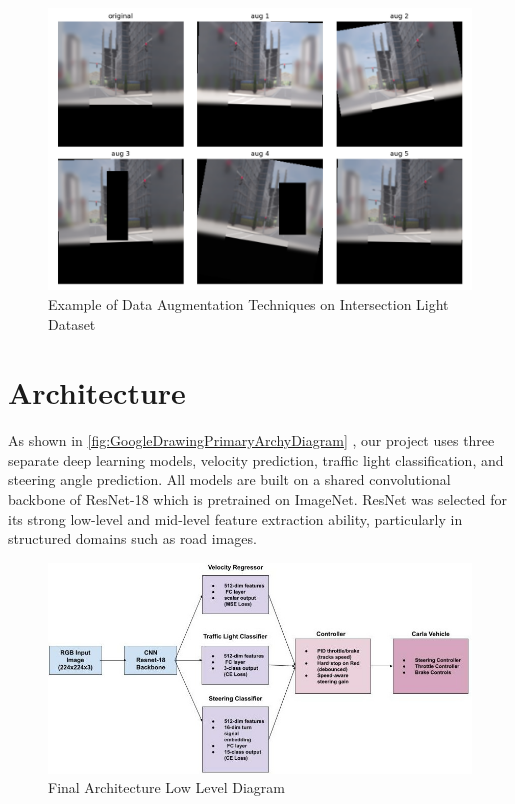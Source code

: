 \documentclass{article} %
\begin{document}
\begin{figure}[H] %
    \centering
    \includegraphics[width=1.0\textwidth]{Data Augmentation.png} %
    \caption{Example of Data Augmentation Techniques on Intersection Light Dataset}
    \label{fig:dataaugmentation}
\end{figure}

\section{Architecture}

As shown in \autoref{fig:GoogleDrawingPrimaryArchyDiagram} , our project uses three separate deep learning models, velocity prediction, traffic light classification, and steering angle prediction. 
All models are built on a shared convolutional backbone of ResNet-18 which is pretrained on ImageNet. ResNet was selected for its strong low-level and mid-level feature extraction ability, particularly in structured domains such as road images. 

\begin{figure}[H] %
    \centering
    \includegraphics[width=1.0\textwidth]{GoogleDrawingPrimaryArchyDiagram.jpg} %
    \caption{Final Architecture Low Level Diagram}
    \label{fig:GoogleDrawingPrimaryArchyDiagram}
\end{figure}
\end{document}
